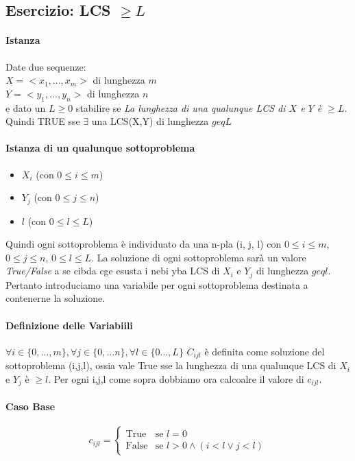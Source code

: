 \subsection*{Esercizio: LCS $\geq L$}

\paragraph*{Istanza} Date due sequenze:\\
$X = <x_1,...,x_m>$ di lunghezza $m$\\
$Y = <y_1,...,y_n>$ di lunghezza $n$\\
e dato un $L \geq 0$ stabilire se \emph{La lunghezza di una qualunque LCS di $X$ e $Y$ è $\geq L$}.
\\Quindi TRUE sse $\exists$ una LCS(X,Y) di lunghezza $geq L$

\paragraph*{Istanza di un qualunque sottoproblema}
\begin{itemize}
	\item[] $X_i$ (con $0 \leq i \leq m$)
	\item[] $Y_j$ (con $0 \leq j \leq n$)
	\item[] $l$ (con $0 \leq l \leq L$)
\end{itemize}
Quindi ogni sottoproblema è individuato da una n-pla (i, j, l) con $0 \leq i \leq m$, $0 \leq j \leq n$, $0 \leq l \leq L$.
La soluzione di ogni sottoproblema sarà un valore \emph{True/False} a se cibda cge esusta i nebi yba LCS di $X_i$ e $Y_j$ di lunghezza $geq l$.
Pertanto introduciamo una variabile per ogni sottoproblema destinata a contenerne la soluzione.
\paragraph*{Definizione delle Variabiili}
$\forall i\in \{0,...,m\}, \forall j\in\{0,...n\}, \forall l\in \{0...,L\}$
$C_{ijl}$ è definita come soluzione del sottoproblema (i,j,l), ossia vale True sse la lunghezza di una qualunque LCS di $X_i$ e $Y_j$ è $\geq l$.
Per ogni i,j,l come sopra dobbiamo ora calcoalre il valore di $c_{ijl}$.
\paragraph*{Caso Base}
\begin{equation}
	c_{ijl} = \begin{cases}
		\text{True}  & \text{se $l = 0$}                     \\
		\text{False} & \text{se $l>0 \wedge (i<l \vee j<l)$}
	\end{cases}
\end{equation}
